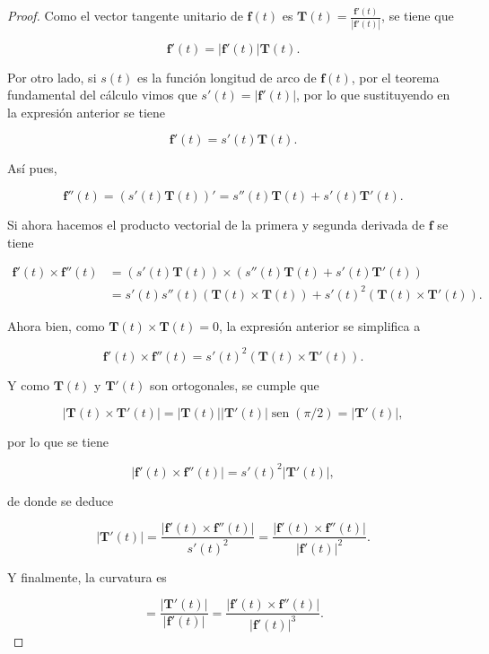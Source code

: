 \documentclass[
  a4paper,
]{scrreport}
\theoremstyle{definition}
\theoremstyle{plain}
\theoremstyle{definition}
\theoremstyle{definition}
\theoremstyle{plain}
\theoremstyle{plain}
\theoremstyle{remark}
\begin{document}
\begin{tcolorbox}[enhanced jigsaw, leftrule=.75mm, colbacktitle=quarto-callout-note-color!10!white, toprule=.15mm, opacityback=0, opacitybacktitle=0.6, toptitle=1mm, breakable, bottomtitle=1mm, colframe=quarto-callout-note-color-frame, rightrule=.15mm, titlerule=0mm, title=\textcolor{quarto-callout-note-color}{\faInfo}\hspace{0.5em}{Demostración}, arc=.35mm, left=2mm, bottomrule=.15mm, colback=white, coltitle=black]

\begin{proof}
Como el vector tangente unitario de \(\mathbf{f}(t)\) es
\(\mathbf{T}(t) = \frac{\mathbf{f}'(t)}{|\mathbf{f}'(t)|}\), se tiene
que

\[
\mathbf{f}'(t) = |\mathbf{f}'(t)|\mathbf{T}(t).
\]

Por otro lado, si \(s(t)\) es la función longitud de arco de
\(\mathbf{f}(t)\), por el teorema fundamental del cálculo vimos que
\(s'(t)=|\mathbf{f}'(t)|\), por lo que sustituyendo en la expresión
anterior se tiene

\[
\mathbf{f}'(t) = s'(t)\mathbf{T}(t).
\]

Así pues,

\[
\mathbf{f}''(t) 
= (s'(t)\mathbf{T}(t))'
= s''(t)\mathbf{T}(t)+s'(t)\mathbf{T}'(t).
\]

Si ahora hacemos el producto vectorial de la primera y segunda derivada
de \(\mathbf{f}\) se tiene

\begin{align*}
\mathbf{f}'(t)\times \mathbf{f}''(t) 
&= (s'(t)\mathbf{T}(t))\times (s''(t)\mathbf{T}(t)+s'(t)\mathbf{T}'(t))\\
&= s'(t)s''(t)(\mathbf{T}(t)\times \mathbf{T}(t)) + s'(t)^2 (\mathbf{T}(t)\times \mathbf{T}'(t)).
\end{align*}

Ahora bien, como \(\mathbf{T}(t)\times \mathbf{T}(t)=0\), la expresión
anterior se simplifica a

\[
\mathbf{f}'(t)\times \mathbf{f}''(t) 
= s'(t)^2 (\mathbf{T}(t)\times \mathbf{T}'(t)).
\]

Y como \(\mathbf{T}(t)\) y \(\mathbf{T}'(t)\) son ortogonales, se cumple
que

\[
|\mathbf{T}(t)\times \mathbf{T}'(t)| = |\mathbf{T}(t)||\mathbf{T}'(t)|\operatorname{sen}(\pi/2) = |\mathbf{T}'(t)|,
\]

por lo que se tiene

\[
|\mathbf{f}'(t)\times \mathbf{f}''(t)| 
= s'(t)^2 |\mathbf{T}'(t)|,
\]

de donde se deduce

\[
|\mathbf{T}'(t)| 
= \frac{|\mathbf{f}'(t)\times \mathbf{f}''(t)|}{s'(t)^2}
= \frac{|\mathbf{f}'(t)\times \mathbf{f}''(t)|}{|\mathbf{f}'(t)|^2}.
\]

Y finalmente, la curvatura es

\[
= \frac{|\mathbf{T}'(t)|}{|\mathbf{f}'(t)|} 
= \frac{|\mathbf{f}'(t)\times \mathbf{f}''(t)|}{|\mathbf{f}'(t)|^3}.
\]
\end{proof}

\end{tcolorbox}
\end{document}
